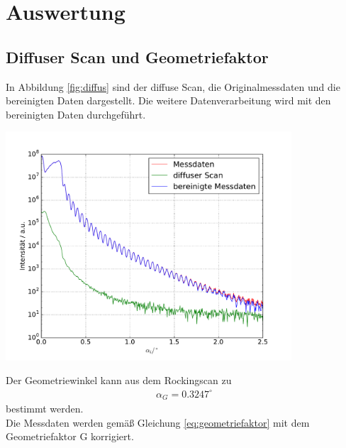 \documentclass[captions=tableheading]{scrartcl}
\begin{document}
\section{Auswertung}

\subsection{Diffuser Scan und Geometriefaktor}
In Abbildung \ref{fig:diffus} sind der diffuse Scan, die Originalmessdaten und die bereinigten Daten dargestellt. Die weitere Datenverarbeitung wird mit den bereinigten Daten durchgeführt.
\begin{center}
	\includegraphics[width=0.8\textwidth]{images/rawdata.pdf}
	\label{fig:diffus}
\end{center}
Der Geometriewinkel kann aus dem Rockingscan zu
\begin{align*}
\alpha_G=0.3247^{\circ}
\end{align*}
bestimmt werden. \\
Die Messdaten werden gemäß Gleichung \ref{eq:geometriefaktor} mit dem Geometriefaktor G korrigiert.
\end{document}
